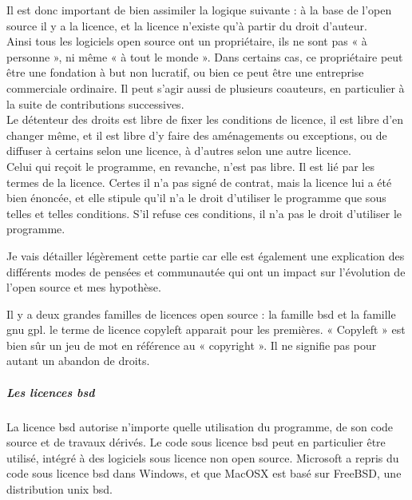 			Il est donc important de bien assimiler la logique suivante : à la base de l'open source il y a la licence, et la licence n'existe qu'à partir du droit d'auteur.\\

			Ainsi tous les logiciels open source ont un propriétaire, ils ne sont pas « à personne », ni même « à tout le monde ». Dans certains cas, ce propriétaire peut être une fondation à but non lucratif, ou bien ce peut être une entreprise commerciale ordinaire. Il peut s'agir aussi de plusieurs coauteurs, en particulier à la suite de contributions successives.\\

			Le détenteur des droits est libre de fixer les conditions de licence, il est libre d'en changer même, et il est libre d'y faire des aménagements ou exceptions, ou de diffuser à certains selon une licence, à d'autres selon une autre licence.\\

			Celui qui reçoit le programme, en revanche, n'est pas libre. Il est lié par les termes de la licence. Certes il n'a pas signé de contrat, mais la licence lui a été bien énoncée, et elle stipule qu'il n'a le droit d'utiliser le programme que sous telles et telles conditions. S'il refuse ces conditions, il n'a pas le droit d'utiliser le programme. 

			Je vais détailler légèrement cette partie car elle est également une explication des différents modes de pensées et communautée qui ont un impact sur l'évolution de l'open source et mes hypothèse.

			Il y a deux grandes familles de licences open source : la famille \acrshort{bsd} et la famille \acrshort{gnu gpl}. le terme de licence copyleft apparait pour les premières. « Copyleft » est bien sûr un jeu de mot en référence au « copyright ». Il ne signifie pas pour autant un abandon de droits.\\
			

				\subparagraph{Les licences \acrshort{bsd}\\}

				La licence \acrfull{bsd} autorise n'importe quelle utilisation du programme, de son code source et de travaux dérivés. Le code sous licence \acrshort{bsd} peut en particulier être utilisé, intégré à des logiciels sous licence non open source. Microsoft a repris du code sous licence \acrshort{bsd} dans Windows, et que MacOSX est basé sur FreeBSD, une distribution unix \acrshort{bsd}.\\

